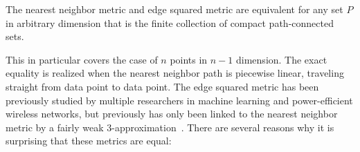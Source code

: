\begin{theorem}\label{thm:NN} The nearest neighbor metric and edge squared
metric are equivalent for any set $P$ in arbitrary dimension that is the
finite collection of compact path-connected sets.
\end{theorem}

This in particular covers the case of $n$ points in $n-1$ dimension. The exact equality is realized when the nearest neighbor path is piecewise
linear, traveling straight from data point to data point.
The edge squared metric has been previously studied by multiple researchers
in machine learning and power-efficient wireless networks, but previously
has only been linked to the nearest neighbor metric by a fairly weak
3-approximation~\cite{cohen15approximating}.
There are several reasons why it is surprising that these metrics are equal:

